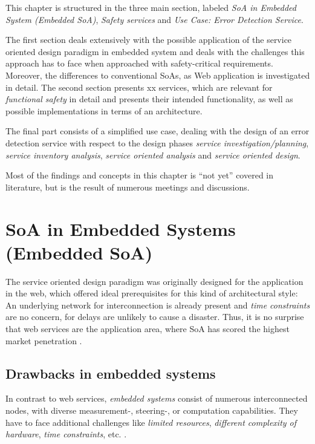 This chapter is structured in the three main section, labeled \emph{SoA in Embedded System (Embedded SoA)}, \emph{Safety services} and \emph{Use Case: Error Detection Service}. 

The first section deals extensively with the possible application of the service oriented design paradigm in embedded system and deals with the challenges this approach has to face when approached with safety-critical requirements. Moreover, the differences to conventional SoAs, as Web application is investigated in detail. 
The second section presents xx services, which are relevant for \emph{functional safety} in detail and presents their intended functionality, as well as possible implementations in terms of an architecture.

The final part consists of a simplified use case, dealing with the design of an error detection service with respect to the design phases \emph{service investigation/planning}, \emph{service inventory analysis}, \emph{service oriented analysis} and \emph{service oriented design}.

Most of the findings and concepts in this chapter is ``not yet'' covered in literature, but is the result of numerous meetings and discussions.









\section{SoA in Embedded Systems (Embedded SoA)}

The service oriented design paradigm was originally designed for the application in the web, which offered ideal prerequisites for this kind of architectural style: An underlying network for interconnection is already present and \emph{time constraints} are no concern, for delays are unlikely to cause a disaster. Thus, it is no surprise that web services are the application area, where SoA has scored the highest market penetration \cite{rodrigues2011} \cite{buckl}.


\subsection{Drawbacks in embedded systems}
In contrast to web services, \emph{embedded systems} consist of numerous interconnected nodes, with diverse measurement-, steering-, or computation capabilities. They have to face additional challenges like \emph{limited resources}, \emph{different complexity of hardware}, \emph{time constraints}, etc. \cite{scholz} \cite{sommer}. 

